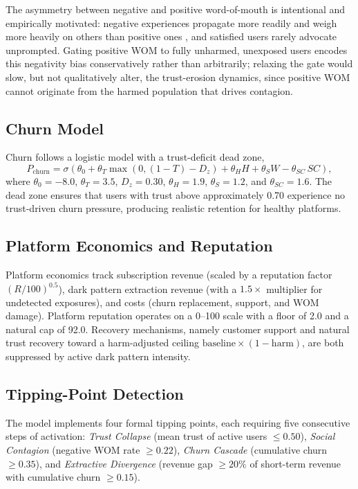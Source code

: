 \documentclass[a4paper,fleqn]{cas-sc}
\begin{document}
The asymmetry between negative and positive word-of-mouth is intentional and empirically motivated: negative experiences propagate more readily and weigh more heavily on others than positive ones \citep{baumeister2001}, and satisfied users rarely advocate unprompted. Gating positive WOM to fully unharmed, unexposed users encodes this negativity bias conservatively rather than arbitrarily; relaxing the gate would slow, but not qualitatively alter, the trust-erosion dynamics, since positive WOM cannot originate from the harmed population that drives contagion.

\subsection{Churn Model}
Churn follows a logistic model with a trust-deficit dead zone,
\begin{equation}
P_{\text{churn}} = \sigma\!\left(\theta_0 + \theta_T \max(0, (1-T) - D_z) + \theta_H H + \theta_S W - \theta_{SC}\, SC\right),
\end{equation}
where $\theta_0 = -8.0$, $\theta_T = 3.5$, $D_z = 0.30$, $\theta_H = 1.9$, $\theta_S = 1.2$, and $\theta_{SC} = 1.6$. The dead zone ensures that users with trust above approximately 0.70 experience no trust-driven churn pressure, producing realistic retention for healthy platforms.

\subsection{Platform Economics and Reputation}
Platform economics track subscription revenue (scaled by a reputation factor $(R/100)^{0.5}$), dark pattern extraction revenue (with a $1.5\times$ multiplier for undetected exposures), and costs (churn replacement, support, and WOM damage). Platform reputation operates on a 0--100 scale with a floor of 2.0 and a natural cap of 92.0. Recovery mechanisms, namely customer support and natural trust recovery toward a harm-adjusted ceiling $\text{baseline}\times(1-\text{harm})$, are both suppressed by active dark pattern intensity.

\subsection{Tipping-Point Detection}
The model implements four formal tipping points, each requiring five consecutive steps of activation: \emph{Trust Collapse} (mean trust of active users $\le 0.50$), \emph{Social Contagion} (negative WOM rate $\ge 0.22$), \emph{Churn Cascade} (cumulative churn $\ge 0.35$), and \emph{Extractive Divergence} (revenue gap $\ge 20\%$ of short-term revenue with cumulative churn $\ge 0.15$).
\end{document}
